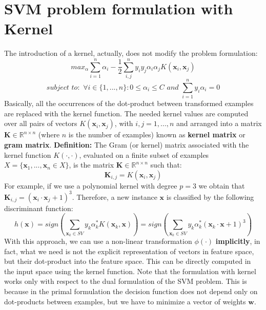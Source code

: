 \section{SVM problem formulation with Kernel}
The introduction of a kernel, actually, does not modify the problem formulation:
\[max_{\alpha}\sum_{i=1}^{n}\alpha_{i} - \frac{1}{2}\sum_{i,j}^{n}y_{i}y_{j}\alpha_{i}\alpha_{j}K(\textbf{x}_{i}, \textbf{x}_{j})\]
\[subject \,\, to: \,\, \forall i \in \{1,...,n\} : 0 \leq \alpha_{i} \leq C \,\, and \,\, \sum_{i=1}^{n}y_{i}\alpha_{i} = 0\]
Basically, all the occurrences of the dot-product between transformed examples are replaced with the kernel function. The needed kernel values are computed over all pairs of vectors $K(\textbf{x}_{i}, \textbf{x}_{j})$, with $i,j = 1,...,n$ and arranged into a matrix $\textbf{K} \in \mathbb{R}^{n \times n}$ (where $n$ is the number of examples) known as \textbf{kernel matrix} or \textbf{gram matrix}.\newline\newline
\textbf{Definition:}\newline
The Gram (or kernel) matrix associated with the kernel function $K(\cdot, \cdot)$, evaluated on a finite subset of examples $X = \{\textbf{x}_{1},...,\textbf{x}_{n} \in X\}$, is the matrix $\textbf{K} \in \mathbb{R}^{n \times n}$ such that:
\[\textbf{K}_{i,j} = K(\textbf{x}_{i}, \textbf{x}_{j})\]
For example, if we use a polynomial kernel with degree $p = 3$ we obtain that $\textbf{K}_{i,j} = (\textbf{x}_{i} \cdot \textbf{x}_{j} + 1)^{3}$. Therefore, a new instance $\textbf{x}$ is classified by the following discriminant function:
\[h(\textbf{x}) = sign( \sum_{\textbf{x}_{k} \in SV}y_{k}\alpha_{k}^{*}K(\textbf{x}_{k}, \textbf{x})) = sign(\sum_{\textbf{x}_{k} \in SV}y_{k}\alpha_{k}^{*}(\textbf{x}_{k} \cdot \textbf{x} + 1)^{3})\]
With this approach, we can use a non-linear transformation $\phi(\cdot)$ \textbf{implicitly}, in fact, what we need is not the explicit representation of vectors in feature space, but their dot-product into the feature space. This can be directly computed in the input space using the kernel function.\newline\newline
Note that the formulation with kernel works only with respect to the dual formulation of the SVM problem. This is because in the primal formulation the decision function does not depend only on dot-products between examples, but we have to minimize a vector of weights $\textbf{w}$.

